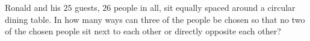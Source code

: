 Ronald and his $25$ guests, $26$ people in all, sit equally spaced around a circular dining table. In how many ways can three of the people be chosen so that no two of the chosen people sit next to each other or directly opposite each other?
